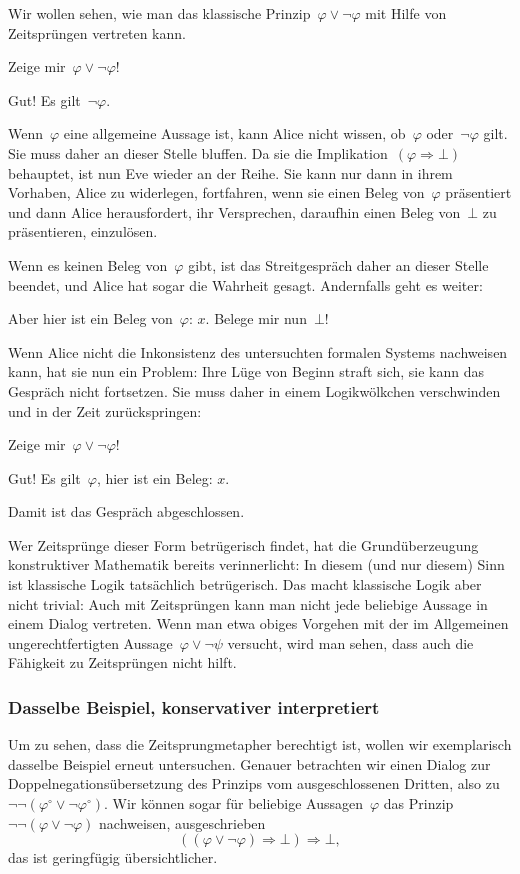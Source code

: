 \documentclass[a4paper,ngerman,12pt]{scrartcl}
\theoremstyle{definition}
\theoremstyle{plain}
\theoremstyle{remark}
\renewcommand{\_}{\mathpunct{.}\,}
\newcommand{\?}{\,{:}\,}
\newcommand{\Alice}{\item[Alice]}
\newcommand{\Eve}{\item[Eve]}
\newenvironment{dialogue}{%
  \begin{list}{}{%
    \settowidth{\labelwidth}{\qquad\emph{Alice:}}
    \setlength{\labelsep}{0.3cm}
    \setlength{\leftmargin}{\labelwidth}
    \addtolength{\leftmargin}{\labelsep}
    \setlength{\rightmargin}{0pt}
    \setlength{\parsep}{0.5ex plus 0.2ex minus 0.1ex}
    \setlength{\itemsep}{0 ex plus 0.2ex}
    \renewcommand{\makelabel}[1]{\qquad\emph{##1:}\hfil}
    }
}{\end{list}}
\begin{document}
Wir wollen sehen, wie man das klassische Prinzip~$\varphi \vee
\neg\varphi$ mit Hilfe von Zeitsprüngen vertreten kann.
\begin{dialogue}
\Eve Zeige mir~$\varphi \vee \neg\varphi$!
\Alice Gut! Es gilt~$\neg\varphi$.
\end{dialogue}
Wenn~$\varphi$ eine allgemeine Aussage ist, kann Alice nicht wissen,
ob~$\varphi$ oder~$\neg\varphi$ gilt. Sie muss daher an dieser Stelle bluffen.
Da sie die Implikation~$(\varphi \Rightarrow \bot)$ behauptet, ist nun Eve
wieder an der Reihe. Sie kann nur dann in ihrem Vorhaben, Alice zu widerlegen,
fortfahren, wenn sie einen Beleg von~$\varphi$ präsentiert und dann Alice
herausfordert, ihr Versprechen, daraufhin einen Beleg von~$\bot$ zu
präsentieren, einzulösen.

Wenn es keinen Beleg von~$\varphi$ gibt, ist das Streitgespräch daher an dieser
Stelle beendet, und Alice hat sogar die Wahrheit gesagt. Andernfalls geht es
weiter:
\begin{dialogue}
\Eve Aber hier ist ein Beleg von~$\varphi$: $x$. Belege mir nun~$\bot$!
\end{dialogue}
Wenn Alice nicht die Inkonsistenz des untersuchten formalen Systems nachweisen
kann, hat sie nun ein Problem: Ihre Lüge von Beginn straft sich, sie kann das
Gespräch nicht fortsetzen. Sie muss daher in einem Logikwölkchen verschwinden
und in der Zeit zurückspringen:
\begin{dialogue}
\Eve Zeige mir~$\varphi \vee \neg\varphi$!
\Alice Gut! Es gilt~$\varphi$, hier ist ein Beleg: $x$.
\end{dialogue}
Damit ist das Gespräch abgeschlossen.

Wer Zeitsprünge dieser Form betrügerisch findet, hat die
Grund\-über\-zeu\-gung konstruktiver Mathematik bereits verinnerlicht: In diesem (und
nur diesem) Sinn ist klassische Logik tatsächlich betrügerisch. Das macht
klassische Logik aber nicht trivial: Auch mit Zeitsprüngen kann man nicht jede
beliebige Aussage in einem Dialog vertreten. Wenn man etwa obiges Vorgehen
mit der im Allgemeinen ungerechtfertigten Aussage~$\varphi \vee \neg\psi$
versucht, wird man sehen, dass auch die Fähigkeit zu Zeitsprüngen
nicht hilft.


\subsubsection*{Dasselbe Beispiel, konservativer interpretiert}

Um zu sehen, dass die Zeitsprungmetapher berechtigt ist, wollen wir
exemplarisch dasselbe Beispiel erneut untersuchen. Genauer betrachten
wir einen Dialog zur
Dop\-pel\-ne\-ga\-tions\-über\-set\-zung des Prinzips vom ausgeschlossenen
Dritten, also zu $\neg\neg(\varphi^\circ \vee \neg\varphi^\circ)$. Wir können
sogar für beliebige Aussagen~$\varphi$ das Prinzip $\neg\neg(\varphi \vee
\neg\varphi)$ nachweisen, ausgeschrieben
\[ ((\varphi \vee \neg\varphi) \Rightarrow \bot) \Rightarrow \bot, \]
das ist geringfügig übersichtlicher.
\end{document}
